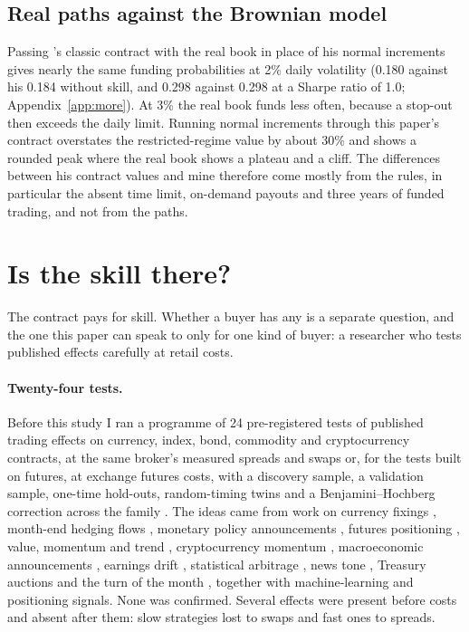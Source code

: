 \documentclass[11pt]{article}
\begin{document}
\subsection{Real paths against the Brownian model}
Passing \citet{lim2026}'s classic contract with the real book in place of his normal increments gives nearly the
same funding probabilities at 2\% daily volatility (0.180 against his 0.184 without skill, and 0.298 against
0.298 at a Sharpe ratio of 1.0; Appendix~\ref{app:more}). At 3\% the real book funds less often, because a
stop-out then exceeds the daily limit. Running normal increments through this paper's contract overstates the
restricted-regime value by about 30\% and shows a rounded peak where the real book shows a plateau and a cliff.
The differences between his contract values and mine therefore come mostly from the rules, in particular the
absent time limit, on-demand payouts and three years of funded trading, and not from the paths.

\section{Is the skill there?}\label{sec:skill}
The contract pays for skill. Whether a buyer has any is a separate question, and the one this paper can speak to
only for one kind of buyer: a researcher who tests published effects carefully at retail costs.

\paragraph{Twenty-four tests.} Before this study I ran a programme of 24 pre-registered tests of published
trading effects on currency, index, bond, commodity and cryptocurrency contracts, at the same broker's measured
spreads and swaps or, for the tests built on futures, at exchange futures costs, with a discovery sample, a validation sample, one-time hold-outs, random-timing twins and a Benjamini--Hochberg
correction across the family \citep{benjamini1995}. The ideas came from work on currency fixings
\citep{krohn2024}, month-end hedging flows \citep{melvin2015}, monetary policy announcements
\citep{mueller2017,lee2025}, futures positioning \citep{tornell2012}, value, momentum and trend
\citep{asness2013,moskowitz2012}, cryptocurrency momentum \citep{liu2021}, macroeconomic announcements
\citep{andersen2003}, earnings drift \citep{bernard1989}, statistical arbitrage \citep{avellaneda2010,gatev2006},
news tone \citep{tetlock2007}, Treasury auctions \citep{lou2013} and the turn of the month
\citep{lakonishok1988}, together with machine-learning and positioning signals. None was confirmed. Several
effects were present before costs and absent after them: slow strategies lost to swaps and fast ones to spreads.
\end{document}
